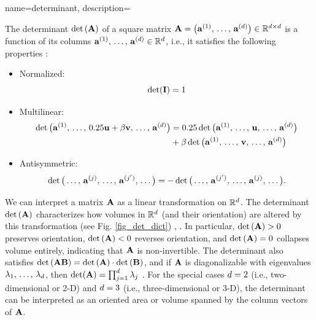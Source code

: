 {name={determinant},
	description={The determinant $\det\,({\bf A})$ of a square \gls{matrix} 
		$\mA =\linebreak \big( \va^{(1)},\,\ldots,\,\va^{(\nrfeatures)} \big) \in \mathbb{R}^{\nrfeatures \times \nrfeatures}$ is a 
		\gls{function} of its columns ${\bf a}^{(1)},\,\ldots,\,{\bf a}^{(d)} \in \mathbb{R}^{d}$, i.e., it satisfies 
		the following properties \cite{DirschmidHansJorg1996TuF}:
		\begin{itemize}
			\item Normalized: $$\det (\mathbf{I}) = 1$$ 
			\item Multilinear: \begin{align} \nonumber \det \big({\bf a}^{(1)},\,\ldots,\,0.25{\bf u}+ \beta {\bf v},\,\ldots,\,{\bf a}^{(d)} \big) & = 0.25\det \big({\bf a}^{(1)},\,\ldots,\,{\bf u},\,\ldots,\,{\bf a}^{(d)} \big) \\ 
			& +\beta\det \big({\bf a}^{(1)},\,\ldots,\,{\bf v},\,\ldots,\,{\bf a}^{(d)} \big) \nonumber
			\end{align}
			\item Antisymmetric: $$\det \big(\ldots,\,{\bf a}^{(j)}, \,\ldots, \,{\bf a}^{(j')},\,\ldots \big) = - \det \big(\ldots,\,{\bf a}^{(j')}, \,\ldots, \,{\bf a}^{(j)},\,\ldots \big).$$ 
		\end{itemize} 
		We can interpret a \gls{matrix} ${\bf A}$ as a linear transformation on $\mathbb{R}^{d}$.
		The determinant $\det\,({\bf A})$ characterizes how volumes in $\mathbb{R}^d$ (and their orientation) 
		are altered by this transformation (see Fig. \ref{fig_det_dict}) \cite{GolubVanLoanBook}, \cite{Strang2007}. 
 		In particular, $\det\,({\bf A}) > 0$ preserves orientation, $\det\,({\bf A}) < 0$ reverses orientation, 
 		and $\det\,({\bf A}) = 0$ collapses volume entirely, indicating that ${\bf A}$ is non-invertible. 
 		The determinant also satisfies $\det\,({\bf A} {\bf B}) = \det\,({\bf A}) \cdot \det\,({\bf B})$, and if ${\bf A}$ is 
 		diagonalizable with \glspl{eigenvalue} $\lambda_{1}, \,\ldots, \,\lambda_{d}$, then 
		$\det({\bf A}) = \prod_{j=1}^{d} \lambda_{j}$ \cite{HornMatAnalysis}.
    		For the special cases $d=2$ (i.e., two-dimensional or 2-D) and $d=3$ (i.e., three-dimensional or 3-D), 
		the determinant can be interpreted as an oriented area or volume spanned by the column \glspl{vector} of ${\bf A}$.
    		\begin{figure}[H]
    			\begin{center}

\end{center}
\end{figure}}}
